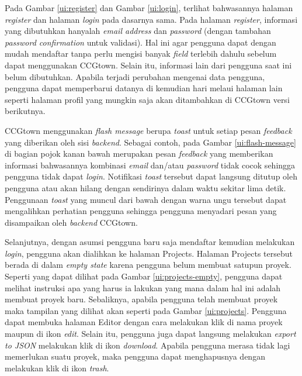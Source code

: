 Pada Gambar \ref{ui:register} dan Gambar \ref{ui:login}, terlihat bahwasannya halaman
\textit{register} dan halaman \textit{login} pada dasarnya sama. Pada halaman
\textit{register}, informasi yang dibutuhkan hanyalah \textit{email address} dan
\textit{password} (dengan tambahan \textit{password confirmation} untuk validasi).
Hal ini agar pengguna dapat dengan mudah mendaftar tanpa perlu mengisi banyak \textit{field}
terlebih dahulu sebelum dapat menggunakan CCGtown. Selain itu, informasi lain dari
pengguna saat ini belum dibutuhkan. Apabila terjadi perubahan mengenai data pengguna,
pengguna dapat memperbarui datanya di kemudian hari melaui halaman lain seperti halaman profil
yang mungkin saja akan ditambahkan di CCGtown versi berikutnya.

CCGtown menggunakan \textit{flash message} berupa \textit{toast} untuk setiap pesan
\textit{feedback} yang diberikan oleh sisi \textit{backend}. Sebagai contoh, pada Gambar
\ref{ui:flash-message} di bagian pojok kanan bawah merupakan pesan \textit{feedback}
yang memberikan informasi bahwasannya kombinasi \textit{email} dan/atau \textit{password}
tidak cocok sehingga pengguna tidak dapat \textit{login}. Notifikasi \textit{toast} tersebut
dapat langsung ditutup oleh pengguna atau akan hilang dengan sendirinya dalam waktu sekitar
lima detik. Penggunaan \textit{toast} yang muncul dari bawah dengan warna ungu tersebut
dapat mengalihkan perhatian pengguna sehingga pengguna menyadari pesan yang disampaikan oleh
\textit{backend} CCGtown.

Selanjutnya, dengan asumsi pengguna baru saja mendaftar kemudian melakukan \textit{login},
pengguna akan dialihkan ke halaman Projects. Halaman Projects tersebut berada di dalam
\textit{empty state} karena pengguna belum membuat satupun proyek. Seperti yang dapat
dilihat pada Gambar \ref{ui:projects-empty}, pengguna dapat melihat instruksi apa yang
harus ia lakukan yang mana dalam hal ini adalah membuat proyek baru.
Sebaliknya, apabila pengguna telah membuat proyek maka tampilan yang dilihat akan
seperti pada Gambar \ref{ui:projects}. Pengguna dapat membuka halaman Editor dengan
cara melakukan klik di nama proyek maupun di ikon \textit{edit}. Selain itu,
pengguna juga dapat langsung melakukan \textit{export to JSON} melakukan klik di ikon
\textit{download}. Apabila pengguna merasa tidak lagi memerlukan suatu proyek, maka
pengguna dapat menghapusnya dengan melakukan klik di ikon \textit{trash}.

